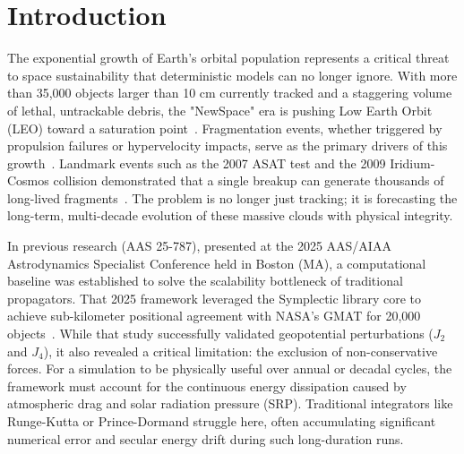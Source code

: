 \documentclass[letterpaper, preprint, 11pt]{AAS}
\begin{document}
\section{Introduction}

The exponential growth of Earth’s orbital population represents a critical threat to space sustainability that deterministic models can no longer ignore. With more than 35,000 objects larger than 10 cm currently tracked and a staggering volume of lethal, untrackable debris, the "NewSpace" era is pushing Low Earth Orbit (LEO) toward a saturation point~\cite{european_space_agency_space_nodate,diserens_newspace_2020}. Fragmentation events, whether triggered by propulsion failures or hypervelocity impacts, serve as the primary drivers of this growth~\cite{kessler_collision_1978}. Landmark events such as the 2007 ASAT test and the 2009 Iridium-Cosmos collision demonstrated that a single breakup can generate thousands of long-lived fragments~\cite{wang_analysis_2010}. The problem is no longer just tracking; it is forecasting the long-term, multi-decade evolution of these massive clouds with physical integrity.

In previous research (AAS 25-787), presented at the 2025 AAS/AIAA Astrodynamics Specialist Conference held in Boston (MA), a computational baseline was established to solve the scalability bottleneck of traditional propagators. That 2025 framework leveraged the Symplectic library core to achieve sub-kilometer positional agreement with NASA’s GMAT for 20,000 objects~\cite{noauthor_general_nodate}. While that study successfully validated geopotential perturbations ($J_2$ and $J_4$), it also revealed a critical limitation: the exclusion of non-conservative forces. For a simulation to be physically useful over annual or decadal cycles, the framework must account for the continuous energy dissipation caused by atmospheric drag and solar radiation pressure (SRP). Traditional integrators like Runge-Kutta or Prince-Dormand struggle here, often accumulating significant numerical error and secular energy drift during such long-duration runs.
\end{document}
